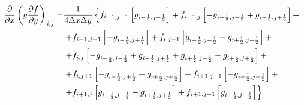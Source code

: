 \documentclass[12pt, a4paper]{article}
\newcommand\onehalf{\frac{1}{2}} %
\begin{document}
\begin{equation*}
    \begin{split}
	    \left.
	        \frac
                {\partial }
                {\partial x}
	        \left(
	            g
	            \frac
	                {\partial f}
	                {\partial y}
	        \right)
        \right._{i, j}
	    = &
	    \frac
	        {1}
	        {4 \Delta x \Delta y}
	    \left\{
	        f_{i - 1, j - 1}
	        \left[
                g_{i - \onehalf, j - \onehalf}
            \right]
	        +
	        f_{i - 1, j}
	       \left[
	        	-
                g_{i - \onehalf, j - \onehalf}
	        	+
                g_{i - \onehalf, j + \onehalf}
	        \right]
	        +
        \right.
        \\ &
        \left.
            +
            \newline
	        f_{i - 1, j + 1}
	        \left[
                -
                g_{i - \onehalf, j + \onehalf}
            \right]
	        +
	        f_{i, j - 1}
	        \left[
                g_{i - \onehalf, j - \onehalf}
                -
                g_{i + \onehalf, j - \onehalf}
	    	\right]
            +
        \right.
        \\ &
        \left.
            +
            f_{i, j}
	        \left[
                -
                g_{i - \onehalf, j - \onehalf}
                +
                g_{i - \onehalf, j + \onehalf}
                +
                g_{i + \onehalf, j - \onehalf}
                -
                g_{i + \onehalf, j + \onehalf}
            \right]
            +
        \right.
        \\ &
        \left.
            +
            f_{i, j + 1}
            \left[
                -
                g_{i - \onehalf, j + \onehalf}
                +
                g_{i + \onehalf, j + \onehalf}
            \right]
            +
            f_{i + 1, j - 1}
            \left[
                -
                g_{i + \onehalf, j - \onehalf}
            \right]
            +
        \right.
        \\ &
        \left.
            +
            f_{i + 1, j}
            \left[
                g_{i + \onehalf, j - \onehalf}
                -
                g_{i + \onehalf, j + \onehalf}
            \right]
            +
            f_{i + 1, j + 1}
            \left[
                g_{i + \onehalf, j + \onehalf}
            \right]
        \right\}
    \end{split}
\end{equation*}
\end{document}
